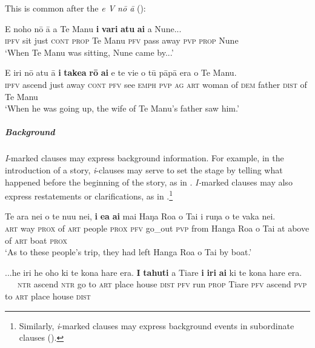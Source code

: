 This is common after the  \textit{e V nō {\ꞌ}ā} ():

\ea\label{ex:7.22}
\gll E noho nō {\ꞌ}ā a Te Manu \textbf{i} \textbf{vari} \textbf{atu} \textbf{ai} a Nune... \\
\textsc{ipfv} sit just \textsc{cont} \textsc{prop} Te Manu \textsc{pfv} pass away \textsc{pvp} \textsc{prop} Nune \\

\glt 
‘When Te Manu was sitting, Nune came by...’ \textstyleExampleref{[R245.174]} 
\z

\ea\label{ex:7.23}
\gll E iri nō atu {\ꞌ}ā \textbf{i} \textbf{take{\ꞌ}a} \textbf{rō} \textbf{ai} e te vi{\ꞌ}e o tū pāpā era o Te Manu.\\
\textsc{ipfv} ascend just away \textsc{cont} \textsc{pfv} see \textsc{emph} \textsc{pvp} \textsc{ag} \textsc{art} woman of \textsc{dem} father \textsc{dist} of Te Manu\\

\glt 
‘When he was going up, the wife of Te Manu’s father saw him.’ \textstyleExampleref{[R245.214]} 
\z

\subparagraph{Background} \textit{I}{}-marked clauses may express background information. For example, in the introduction of a story, \textit{i}{}-clauses may serve to set the stage by telling what happened before the beginning of the story, as in . \textit{I-}marked clauses may also express restatements or clarifications, as in .\footnote{\label{fn:321}Similarly, \textit{i}{}-marked clauses may express background events in subordinate clauses ().}

\ea\label{ex:7.24}
\gll Te ara nei o te nu{\ꞌ}u nei, \textbf{i} \textbf{e{\ꞌ}a} \textbf{ai} mai Haŋa Roa o Tai  {\ꞌ}i ruŋa o te vaka nei.\\
\textsc{art} way \textsc{prox} of \textsc{art} people \textsc{prox} \textsc{pfv} go\_out \textsc{pvp} from Hanga Roa o Tai  at above of \textsc{art} boat \textsc{prox}\\

\glt 
‘As to these people’s trip, they had left Hanga Roa o Tai by boat.’ \textstyleExampleref{[R361.004]} 
\z

\ea\label{ex:7.25}
\gll ...he iri he oho ki te kona hare era. \textbf{I} \textbf{tahuti} a Tiare  \textbf{i} \textbf{iri} \textbf{ai} ki te kona hare era.\\
~~~\textsc{ntr} ascend \textsc{ntr} go to \textsc{art} place house \textsc{dist} \textsc{pfv} run \textsc{prop} Tiare  \textsc{pfv} ascend \textsc{pvp} to \textsc{art} place house \textsc{dist}\\

